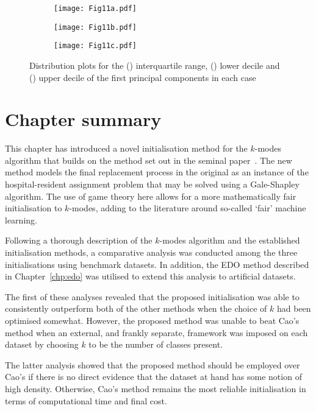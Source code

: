 \begin{figure}
    \centering
    \begin{subfigure}{\imgwidth}
        \texttt{[image: Fig11a.pdf]}
        \caption{}\label{fig:edo_iqr}
    \end{subfigure}\vfill%

    \begin{subfigure}{\imgwidth}
        \texttt{[image: Fig11b.pdf]}
        \caption{}\label{fig:edo_lower}
    \end{subfigure}\vfill%

    \begin{subfigure}{\imgwidth}
        \texttt{[image: Fig11c.pdf]}
        \caption{}\label{fig:edo_upper}
    \end{subfigure}
    \caption{Distribution plots for the () interquartile
        range, () lower decile and
        () upper decile of the first principal components
        in each case}\label{fig:edo_quantiles}
\end{figure}


\section{Chapter summary}\label{sec:kmodes:summary}

This chapter has introduced a novel initialisation method for the \(k\)-modes
algorithm that builds on the method set out in the seminal
paper~\cite{Huang1998}. The new method models the final replacement process in
the original as an instance of the hospital-resident assignment problem that may
be solved using a Gale-Shapley algorithm. The use of game theory here allows for
a more mathematically fair initialisation to \(k\)-modes, adding to the
literature around so-called `fair' machine learning.

Following a thorough description of the \(k\)-modes algorithm and the
established initialisation methods, a comparative analysis was conducted among
the three initialisations using benchmark datasets. In addition, the EDO method
described in Chapter~\ref{chp:edo} was utilised to extend this analysis to
artificial datasets.

The first of these analyses revealed that the proposed initialisation was able
to consistently outperform both of the other methods when the choice of \(k\)
had been optimised somewhat. However, the proposed method was unable to beat
Cao's method when an external, and frankly separate, framework was imposed on
each dataset by choosing \(k\) to be the number of classes present.

The latter analysis showed that the proposed method should be employed over
Cao's if there is no direct evidence that the dataset at hand has some notion of
high density. Otherwise, Cao's method remains the most reliable initialisation
in terms of computational time and final cost.
